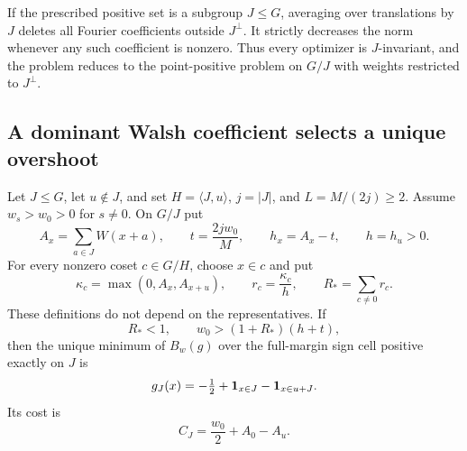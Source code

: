 If the prescribed positive set is a subgroup $J\le G$, averaging over
translations by $J$ deletes all Fourier coefficients outside $J^\perp$.
It strictly decreases the norm whenever any such coefficient is nonzero.
Thus every optimizer is $J$-invariant, and the problem reduces to the
point-positive problem on $G/J$ with weights restricted to $J^\perp$.

\subsection{A dominant Walsh coefficient selects a unique overshoot}

\begin{theorem}\label{thm:dominant}
Let $J\le G$, let $u\notin J$, and set $H=\langle J,u\rangle$,
$j=|J|$, and $L=M/(2j)\ge2$. Assume $w_s>w_0>0$ for $s\ne0$.
On $G/J$ put
\[
 A_x=\sum_{a\in J}W(x+a),\qquad t=\frac{2jw_0}{M},\qquad
 h_x=A_x-t,\qquad h=h_u>0.
\]
For every nonzero coset $c\in G/H$, choose $x\in c$ and put
\[
 \kappa_c=\max(0,A_x,A_{x+u}),\qquad
 r_c=\frac{\kappa_c}{h},\qquad R_* =\sum_{c\ne0}r_c.
\]
These definitions do not depend on the representatives. If
\begin{equation}\label{eq:dominant-conditions}
 R_*<1,\qquad w_0>(1+R_*)(h+t),
\end{equation}
then the unique minimum of $B_w(g)$ over the full-margin sign cell
positive exactly on $J$ is
\begin{equation}\label{eq:overshoot-score}
 g_J(x)=-\tfrac12+\mathbf 1_{x\in J}-\mathbf 1_{x\in u+J}.
\end{equation}
Its cost is
\begin{equation}\label{eq:overshoot-cost}
 C_J=\frac{w_0}{2}+A_0-A_u.
\end{equation}
\end{theorem}
